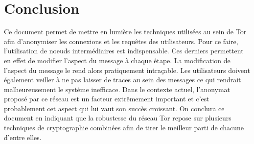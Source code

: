 \documentclass[letterpaper]{article}
\begin{document}
\section{Conclusion}
Ce document permet de mettre en lumière les techniques utilisées au sein de Tor afin d'anonymiser les connexions et les requêtes des utilisateurs. Pour ce faire, l'utilisation de noeuds intermédiaires est indispensable. Ces derniers permettent en effet de modifier l'aspect du message à chaque étape. La modification de l'aspect du message le rend alors pratiquement intraçable. Les utilisateurs doivent également veiller à ne pas laisser de traces au sein des messages ce qui rendrait malheureusement le système inefficace. Dans le contexte actuel, l'anonymat proposé par ce réseau est un facteur extrêmement important et c'est probablement cet aspect qui lui vaut son succès croissant. On conclura ce document en indiquant que la robustesse du réseau Tor repose sur plusieurs techniques de cryptographie combinées afin de tirer le meilleur parti de chacune d'entre elles. 


 
\end{document}
